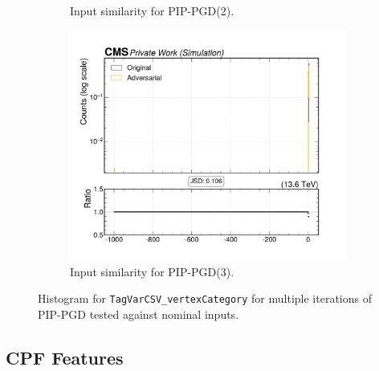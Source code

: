 \begin{figure}[htbp]
\begin{subfigure}[t]{0.32\textwidth}
    \caption*{Input similarity for PIP-PGD(2).}
  \end{subfigure}\hfill
  \begin{subfigure}[t]{0.32\textwidth}
    \includegraphics[width=\linewidth]{media/output/features/compare/combined_it_3/cmp_global_features_TagVarCSV_vertexCategory.pdf}
    \caption*{Input similarity for PIP-PGD(3).}
  \end{subfigure}

  \caption*{Histogram for \texttt{TagVarCSV\_vertexCategory} for multiple iterations of PIP-PGD tested against nominal inputs.}
  \label{fig:combined_input_TagVarCSV_vertexCategory}
\end{figure}

\newpage
\subsection*{CPF Features}


